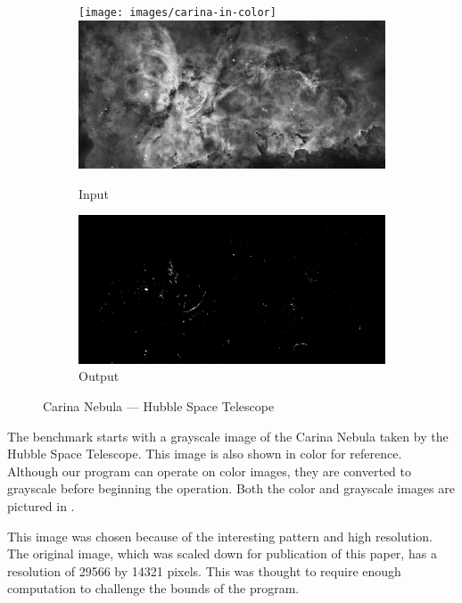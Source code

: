\documentclass[abstracton]{scrartcl}
\begin{document}
\begin{figure}[p]
  \centering
  \begin{subfigure}{0.8\textwidth}
    \texttt{[image: images/carina-in-color]}
    \includegraphics[width=\textwidth]{images/carina-in-grayscale}
    \caption{Input}\label{fig:carina-in}
  \end{subfigure}
  \begin{subfigure}{0.8\textwidth}
    \includegraphics[width=\textwidth]{images/carina-out}
    \caption{Output}\label{fig:carina-out}
  \end{subfigure}
  \caption{Carina Nebula --- Hubble Space Telescope}\label{fig:carina}
\end{figure}

The benchmark starts with a grayscale image of the Carina Nebula taken by the Hubble Space Telescope. This image is also shown in color for reference. Although our program can operate on color images, they are converted to grayscale before beginning the operation. Both the color and grayscale images are pictured in .

This image was chosen because of the interesting pattern and high resolution. The original image, which was scaled down for publication of this paper, has a resolution of 29566 by 14321 pixels. This was thought to require enough computation to challenge the bounds of the program.
\end{document}
